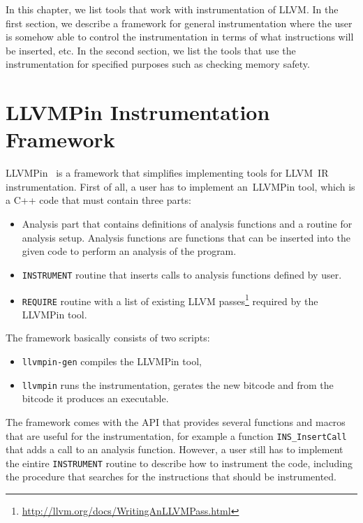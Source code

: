 In this chapter, we list tools that work with instrumentation of LLVM. In the
first section, we describe a framework for general instrumentation where the
user is somehow able to control the instrumentation in terms of what
instructions will be inserted, etc. In the second section, we list the tools
that use the instrumentation for specified purposes such as checking memory
safety.

\section{LLVMPin Instrumentation Framework}

LLVMPin~\cite{llvmpin} is a framework that simplifies implementing tools for
LLVM~IR instrumentation. First of all, a user has to implement an~LLVMPin tool,
which is a C++ code that must contain three parts:

\begin{itemize}
    \item Analysis part that contains definitions of analysis functions and a
    routine for analysis setup. Analysis functions are functions that can be
    inserted into the given code to perform an analysis of the program.
    \item \texttt{INSTRUMENT} routine that inserts calls to analysis functions
    defined by user.
    \item \texttt{REQUIRE} routine with a list of existing LLVM
    passes\footnote{\url{http://llvm.org/docs/WritingAnLLVMPass.html}} required
    by the LLVMPin tool.
\end{itemize}

The framework basically consists of two scripts:

\begin{itemize}
    \item \texttt{llvmpin-gen} compiles the LLVMPin tool,
    \item \texttt{llvmpin} runs the instrumentation, gerates the new bitcode
    and from the bitcode it produces an executable.
\end{itemize}

The framework comes with the API that provides several functions and macros
that are useful for the instrumentation, for example a function
\texttt{INS\_InsertCall} that adds a call to an analysis function. However, a
user still has to implement the eintire \texttt{INSTRUMENT} routine to describe
how to instrument the code, including the procedure that searches for the
instructions that should be instrumented.

